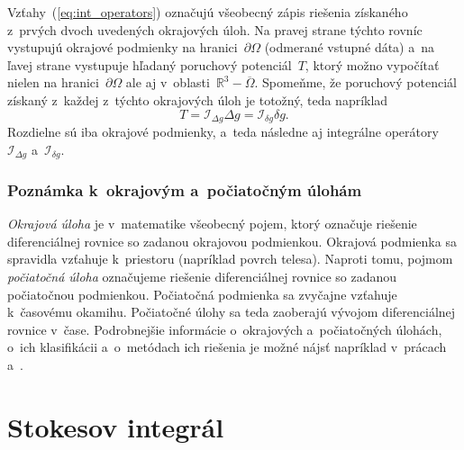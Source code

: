 \documentclass[a4paper, 12pt]{book}
\newcommand{\INT}{\mathcal I}
\begin{document}
Vzťahy~(\ref{eq:int_operators}) označujú všeobecný zápis riešenia získaného 
z~prvých dvoch uvedených okrajových úloh.  Na pravej strane týchto rovníc 
vystupujú okrajové podmienky na hranici~$\partial \Omega$ (odmerané vstupné 
dáta) a~na ľavej strane vystupuje hľadaný poruchový potenciál~$T$, ktorý možno 
vypočítať nielen na hranici~$\partial\Omega$ ale aj v~oblasti~$\mathbb{R}^3 
- \overline\Omega$.  Spomeňme, že poruchový potenciál získaný z~každej z~týchto 
okrajových úloh je totožný, teda napríklad
%
\begin{equation}
T = \INT_{\Delta g} \Delta g = \INT_{\delta g}\delta g{.}
\end{equation}
%
Rozdielne sú iba okrajové podmienky, a~teda následne aj integrálne 
operátory~$\INT_{\Delta g}$ a~$\INT_{\delta g}$.


\subsubsection{Poznámka k~okrajovým a~počiatočným úlohám}

\emph{Okrajová úloha} je v~matematike všeobecný pojem, ktorý označuje riešenie 
diferenciálnej rovnice so zadanou okrajovou podmienkou.  Okrajová podmienka sa 
spravidla vzťahuje k~priestoru (napríklad povrch telesa).  Naproti tomu, pojmom 
\emph{počiatočná úloha} označujeme riešenie diferenciálnej rovnice so zadanou 
počiatočnou podmienkou.  Počiatočná podmienka sa zvyčajne vzťahuje k~časovému 
okamihu.  Počiatočné úlohy sa teda zaoberajú vývojom diferenciálnej rovnice 
v~čase.  Podrobnejšie informácie o~okrajových a~počiatočných úlohách, o~ich 
klasifikácii a~o~metódach ich riešenia je možné nájsť napríklad v~prácach 
\textcite{Janak2006} a~\textcite{Macak2021}.



\section{Stokesov integrál}
\label{sec:stokes_integral}
\end{document}
